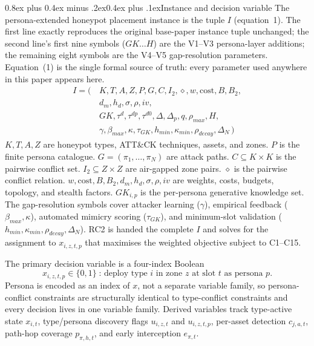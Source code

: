 \documentclass[10pt,twocolumn]{article}
\makeatletter
\renewcommand{\subsection}{\@startsection{subsection}{2}{0pt}%
  {0.8ex plus 0.4ex minus .2ex}{0.4ex plus .1ex}{\normalfont\bfseries}}
\makeatother
\begin{document}
\subsection{Instance and decision variable}
The persona-extended honeypot placement instance is the tuple $I$ (equation~1). The first line exactly reproduces the original base-paper instance tuple unchanged; the second line's first nine symbols ($GK\ldots H$) are the V1--V3 persona-layer additions; the remaining eight symbols are the V4--V5 gap-resolution parameters. Equation~(1) is the single formal source of truth: every parameter used anywhere in this paper appears here.
\begin{equation}
\begin{split}
I = (\,&K,T,A,Z,P,G,C,I_2,\diamond,w,\mathrm{cost},B,B_2,\\
&d_m,h_d,\sigma,\rho,iv,\\
&GK,\tau^{d},\tau^{dp},\tau^{d0},\Delta,\Delta_p,q,\rho_{max},H,\\
&\gamma,\beta_{max},\kappa,\tau_{GK},h_{min},\kappa_{min},\rho_{decay},\Delta_N\,)
\end{split}
\end{equation}
$K,T,A,Z$ are honeypot types, ATT\&CK techniques, assets, and zones. $P$ is the finite persona catalogue. $G=(\pi_1,\ldots,\pi_N)$ are attack paths. $C\subseteq K{\times}K$ is the pairwise conflict set. $I_2\subseteq Z{\times}Z$ are air-gapped zone pairs. $\diamond$ is the pairwise conflict relation. $w,\mathrm{cost},B,B_2,d_m,h_d,\sigma,\rho,iv$ are weights, costs, budgets, topology, and stealth factors. $GK_{i,p}$ is the per-persona generative knowledge set. The gap-resolution symbols cover attacker learning ($\gamma$), empirical feedback ($\beta_{max},\kappa$), automated mimicry scoring ($\tau_{GK}$), and minimum-slot validation ($h_{min},\kappa_{min},\rho_{decay},\Delta_N$). RC2 is handed the complete $I$ and solves for the assignment to $x_{i,z,t,p}$ that maximises the weighted objective subject to C1--C15.

The primary decision variable is a four-index Boolean
\[
x_{i,z,t,p}\in\{0,1\}\;\text{: deploy type }i\text{ in zone }z\text{ at slot }t\text{ as persona }p.
\]
Persona is encoded as an index of $x$, not a separate variable family, so persona-conflict constraints are structurally identical to type-conflict constraints and every decision lives in one variable family. Derived variables track type-active state $x_{i,t}$, type/persona discovery flags $u_{i,z,t}$ and $u_{i,z,t,p}$, per-asset detection $c_{j,a,t}$, path-hop coverage $p_{\pi,h,t}$, and early interception $e_{\pi,t}$.
\end{document}
